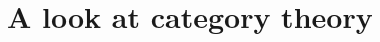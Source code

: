 \documentclass[14pt]{extarticle} %
\begin{document}



%


\section{A look at category theory}

% 
%
% 
%
% 




\newpage 



%
%
%
\end{document}

